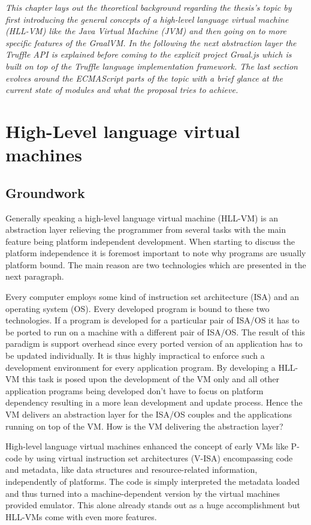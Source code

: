 \emph{This chapter lays out the theoretical background regarding the thesis's topic by first introducing the general concepts of a high-level language virtual machine (HLL-VM) like the Java Virtual Machine (JVM) and then going on to more specific features of the GraalVM. In the following the next abstraction layer the Truffle API is explained before coming to the explicit project Graal.js which is built on top of the Truffle language implementation framework. The last section evolves around the ECMAScript parts of the topic with a brief glance at the current state of modules and what the proposal tries to achieve.}

\section{High-Level language virtual machines}
\subsection{Groundwork}
Generally speaking a high-level language virtual machine (HLL-VM) is an abstraction layer relieving the programmer from several tasks with the main feature being platform independent development. When starting to discuss the platform independence it is foremost important to note why programs are usually platform bound. The main reason are two technologies which are presented in the next paragraph.

Every computer employs some kind of instruction set architecture (ISA) and an operating system (OS). Every developed program is bound to these two technologies. If a program is developed for a particular pair of ISA/OS it has to be ported to run on a machine with a different pair of ISA/OS. The result of this paradigm is support overhead since every ported version of an application has to be updated individually. It is thus highly impractical to enforce such a development environment for every application program. By developing a HLL-VM this task is posed upon the development of the VM only and all other application programs being developed don't have to focus on platform dependency resulting in a more lean development and update process. Hence the VM delivers an abstraction layer for the ISA/OS couples and the applications running on top of the VM. \cite{Smith} How is the VM delivering the abstraction layer?

High-level language virtual machines enhanced the concept of early VMs like P-code by using virtual instruction set architectures (V-ISA) encompassing code and metadata, like data structures and resource-related information, independently of platforms. The code is simply interpreted the metadata loaded and thus turned into a machine-dependent version by the virtual machines provided emulator. \cite{Smith} This alone already stands out as a huge accomplishment but HLL-VMs come with even more features.

